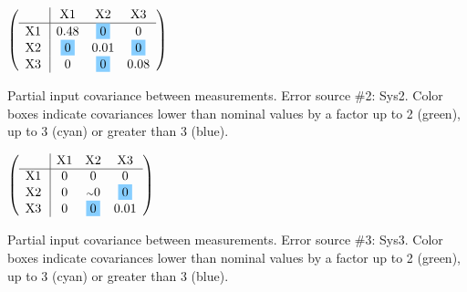 \begin{table}[H]
\scriptsize
\begin{center}
\renewcommand{\arraystretch}{1.1}
\begin{math}\left(\begin{array}{c|ccc}
 & \mathrm{X1} & 
\mathrm{X2} & 
\mathrm{X3} \\
\hline
\mathrm{X1} \hspace*{2pt} &       0.48 &  \colorbox{SkyBlue1}{$ 0$} &  0 \\
\mathrm{X2} \hspace*{2pt} &  \colorbox{SkyBlue1}{$ 0$} &       0.01 &  \colorbox{SkyBlue1}{$ 0$} \\
\mathrm{X3} \hspace*{2pt} &  0 &  \colorbox{SkyBlue1}{$ 0$} &       0.08 \\
\end{array}\right)\end{math}
\caption{Partial input covariance between measurements. Error source \#2: Sys2. Color boxes indicate covariances lower than nominal values by a factor up to 2 (green), up to 3 (cyan) or greater than 3 (blue).}
\renewcommand{\arraystretch}{1}
\end{center}
\end{table}
\begin{table}[H]
\scriptsize
\begin{center}
\renewcommand{\arraystretch}{1.1}
\begin{math}\left(\begin{array}{c|ccc}
 & \mathrm{X1} & 
\mathrm{X2} & 
\mathrm{X3} \\
\hline
\mathrm{X1} \hspace*{2pt} &  0 &  0 &  0 \\
\mathrm{X2} \hspace*{2pt} &  0 &  {\scriptstyle \sim }0 &  \colorbox{SkyBlue1}{$ 0$} \\
\mathrm{X3} \hspace*{2pt} &  0 &  \colorbox{SkyBlue1}{$ 0$} &       0.01 \\
\end{array}\right)\end{math}
\caption{Partial input covariance between measurements. Error source \#3: Sys3. Color boxes indicate covariances lower than nominal values by a factor up to 2 (green), up to 3 (cyan) or greater than 3 (blue).}
\renewcommand{\arraystretch}{1}
\end{center}
\end{table}
